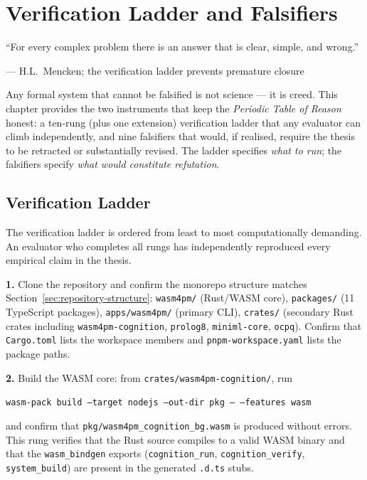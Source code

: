 
\chapter{Verification Ladder and Falsifiers}
\label{chap:verification}

\epigraph{%
  ``For every complex problem there is an answer that is clear, simple, and wrong.''
}{--- H.L.\ Mencken; the verification ladder prevents premature closure}

\noindent Any formal system that cannot be falsified is not science — it is creed. This
chapter provides the two instruments that keep the \emph{Periodic Table of Reason} honest:
a ten-rung (plus one extension) verification ladder that any evaluator can climb
independently, and nine falsifiers that would, if realised, require the thesis to be
retracted or substantially revised. The ladder specifies \emph{what to run}; the
falsifiers specify \emph{what would constitute refutation}.

\section{Verification Ladder}
\label{sec:verification-ladder}

The verification ladder is ordered from least to most computationally demanding. An
evaluator who completes all rungs has independently reproduced every empirical claim in
the thesis.

\medskip
\textbf{1.} Clone the repository and confirm the monorepo structure matches
Section~\ref{sec:repository-structure}: \texttt{wasm4pm/} (Rust/WASM core),
\texttt{packages/} (11 TypeScript packages), \texttt{apps/wasm4pm/} (primary CLI),
\texttt{crates/} (secondary Rust crates including \texttt{wasm4pm-cognition},
\texttt{prolog8}, \texttt{miniml-core}, \texttt{ocpq}). Confirm that
\texttt{Cargo.toml} lists the workspace members and \texttt{pnpm-workspace.yaml}
lists the package paths.

\medskip
\textbf{2.} Build the WASM core: from \texttt{crates/wasm4pm-cognition/}, run
\begin{center}
\texttt{wasm-pack build --target nodejs --out-dir pkg -- --features wasm}
\end{center}
and confirm that \texttt{pkg/wasm4pm\_cognition\_bg.wasm} is produced without errors.
This rung verifies that the Rust source compiles to a valid WASM binary and that the
\texttt{wasm\_bindgen} exports (\texttt{cognition\_run}, \texttt{cognition\_verify},
\texttt{system\_build}) are present in the generated \texttt{.d.ts} stubs.


